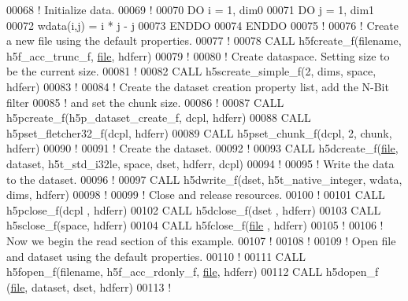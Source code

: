 \begin{DoxyCode}
00068   \textcolor{comment}{! Initialize data.}
00069   \textcolor{comment}{!}
00070   \textcolor{keywordflow}{DO} i = 1, dim0
00071      \textcolor{keywordflow}{DO} j = 1, dim1
00072         wdata(i,j) = i * j - j
00073 \textcolor{keywordflow}{     ENDDO}
00074 \textcolor{keywordflow}{  ENDDO}
00075   \textcolor{comment}{!}
00076   \textcolor{comment}{! Create a new file using the default properties.}
00077   \textcolor{comment}{!}
00078   \textcolor{keyword}{CALL }h5fcreate\_f(filename, h5f\_acc\_trunc\_f, \hyperlink{structfile}{file}, hdferr)
00079   \textcolor{comment}{!}
00080   \textcolor{comment}{! Create dataspace.  Setting size to be the current size.}
00081   \textcolor{comment}{!}
00082   \textcolor{keyword}{CALL }h5screate\_simple\_f(2, dims, space, hdferr)
00083   \textcolor{comment}{!}
00084   \textcolor{comment}{! Create the dataset creation property list, add the N-Bit filter}
00085   \textcolor{comment}{! and set the chunk size.}
00086   \textcolor{comment}{!}
00087   \textcolor{keyword}{CALL }h5pcreate\_f(h5p\_dataset\_create\_f, dcpl, hdferr)
00088   \textcolor{keyword}{CALL }h5pset\_fletcher32\_f(dcpl, hdferr)
00089   \textcolor{keyword}{CALL }h5pset\_chunk\_f(dcpl, 2, chunk, hdferr)
00090   \textcolor{comment}{!}
00091   \textcolor{comment}{! Create the dataset.}
00092   \textcolor{comment}{!}
00093   \textcolor{keyword}{CALL }h5dcreate\_f(\hyperlink{structfile}{file}, dataset, h5t\_std\_i32le, space, dset, hdferr, dcpl)
00094   \textcolor{comment}{!}
00095   \textcolor{comment}{! Write the data to the dataset.}
00096   \textcolor{comment}{!}
00097   \textcolor{keyword}{CALL }h5dwrite\_f(dset, h5t\_native\_integer, wdata, dims, hdferr)
00098   \textcolor{comment}{!}
00099   \textcolor{comment}{! Close and release resources.}
00100   \textcolor{comment}{!}
00101   \textcolor{keyword}{CALL }h5pclose\_f(dcpl , hdferr)
00102   \textcolor{keyword}{CALL }h5dclose\_f(dset , hdferr)
00103   \textcolor{keyword}{CALL }h5sclose\_f(space, hdferr)
00104   \textcolor{keyword}{CALL }h5fclose\_f(\hyperlink{structfile}{file} , hdferr)
00105   \textcolor{comment}{!}
00106   \textcolor{comment}{! Now we begin the read section of this example.}
00107   \textcolor{comment}{!}
00108   \textcolor{comment}{!}
00109   \textcolor{comment}{! Open file and dataset using the default properties.}
00110   \textcolor{comment}{!}
00111   \textcolor{keyword}{CALL }h5fopen\_f(filename, h5f\_acc\_rdonly\_f, \hyperlink{structfile}{file}, hdferr)
00112   \textcolor{keyword}{CALL }h5dopen\_f (\hyperlink{structfile}{file}, dataset, dset, hdferr)
00113   \textcolor{comment}{!}

\end{DoxyCode}
